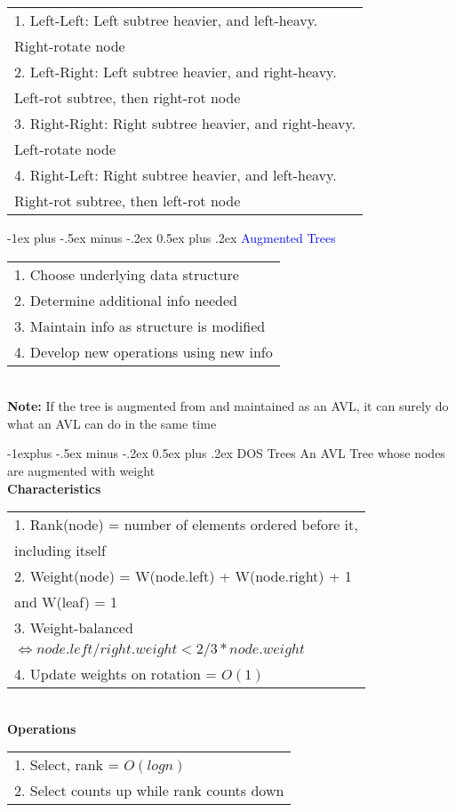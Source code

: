 \documentclass[10pt,landscape]{article}
\makeatletter
\renewcommand{\section}{\@startsection{section}{1}{0mm}%
                                {-1ex plus -.5ex minus -.2ex}%
                                {0.5ex plus .2ex}%
                                {\normalfont\large\bfseries}}
\renewcommand{\subsection}{\@startsection{subsection}{2}{0mm}%
                                {-1explus -.5ex minus -.2ex}%
                                {0.5ex plus .2ex}%
                                {\normalfont\normalsize\bfseries}}
\makeatother
\begin{document}
\begin{multicols}{3}
\begin{tabular}{l}
1. Left-Left: Left subtree heavier, and left-heavy. \\ Right-rotate node \\ 
2. Left-Right: Left subtree heavier, and right-heavy. \\ Left-rot subtree, then right-rot node \\ 
3. Right-Right: Right subtree heavier, and right-heavy. \\ Left-rotate node \\ 
4. Right-Left: Right subtree heavier, and left-heavy. \\ Right-rot subtree, then left-rot node \\
\end{tabular}

\section{\textcolor{blue}{Augmented Trees}}
\begin{tabular}{l}
1. Choose underlying data structure \\ 
2. Determine additional info needed \\ 
3. Maintain info as structure is modified \\ 
4. Develop new operations using new info 
\end{tabular} \\ 
\textbf{Note:} If the tree is augmented from and maintained as an AVL, it can surely do what an AVL can do in the same time

\subsection{DOS Trees} 
An AVL Tree whose nodes are augmented with weight \\ 
\textbf{Characteristics} \\
\begin{tabular}{l}
1. Rank(node) = number of elements ordered before it, \\ including itself \\ 
2. Weight(node) = W(node.left) + W(node.right) + 1 \\ and W(leaf) = 1 \\ 
3. Weight-balanced \\ $\iff node.left/right.weight < 2/3 * node.weight$ \\ 
4. Update weights on rotation = $O(1)$
\end{tabular} \\
\textbf{Operations} \\ 
\begin{tabular}{l}
1. Select, rank = $O(logn)$ \\ 
2. Select counts up while rank counts down \\ 
\end{tabular} \\ 


\end{multicols}
\end{document}
